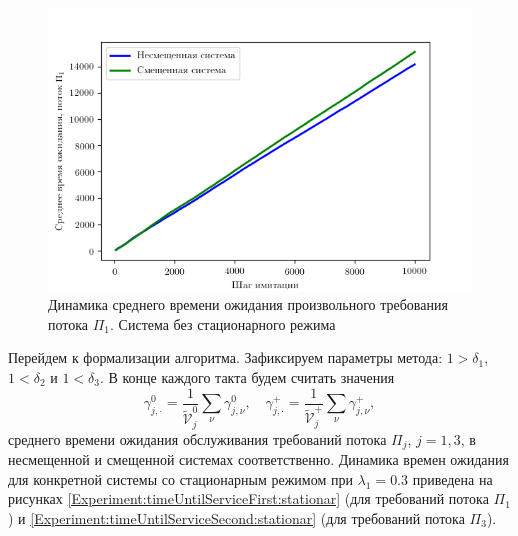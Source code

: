 \begin{figure}[t]
\centering
\includegraphics[scale=1]{Dissertation/Work_structured/Pictures/pic_firstTimeUntilServ.png}
\caption{Динамика среднего времени ожидания произвольного требования потока $\Pi_1$. Система без стационарного режима}
\label{Experiment:timeUntilServiceSecond:nonstationar}
\end{figure}

Перейдем к формализации алгоритма. Зафиксируем параметры метода:  $1 > \delta_1$, $1 < \delta_2$ и $1 < \delta_3$. В конце каждого такта будем считать значения 
\begin{equation}
   \gamma_{j,\cdot}^0 = \frac{1}{\tilde{\mathcal{V}}_j^0}\sum_{\nu} \gamma_{j,\nu}^0, \quad \gamma_{j,\cdot}^+ = \frac{1}{\tilde{\mathcal{V}}_j^+}\sum_{\nu} \gamma_{j,\nu}^+,
\end{equation}
среднего времени ожидания обслуживания требований потока $\Pi_j$, $j=1,3$, в несмещенной и смещенной системах соответственно. Динамика времен ожидания для конкретной системы со стационарным режимом при $\lambda_1=0.3$ приведена на рисунках \ref{Experiment:timeUntilServiceFirst:stationar} (для требований потока $\Pi_1$) и \ref{Experiment:timeUntilServiceSecond:stationar} (для требований потока $\Pi_3$).



